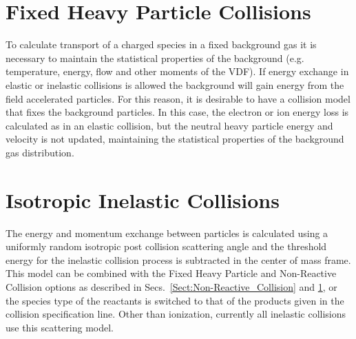 \documentclass[letterpaper,10pt,english,openany,oneside]{sphinxmanual}
\begin{document}
\section{Fixed Heavy Particle Collisions} 
\label{Sect:Fixed_Heavy_Particle_Collision}
To calculate transport of a charged species in a fixed background gas it is necessary to
maintain the statistical properties of the background (e.g. temperature, energy, flow and
other moments of the VDF). If energy exchange in elastic or inelastic collisions is
allowed the background will gain energy from the field accelerated particles. For this
reason, it is desirable to have a collision model that fixes the background particles. In
this case, the electron or ion energy loss is calculated as in an elastic collision, but
the neutral heavy particle energy and velocity is not updated, maintaining the
statistical properties of the background gas distribution.

\section{Isotropic Inelastic Collisions}
The energy and momentum exchange between particles is calculated using a uniformly random
isotropic post collision scattering angle and the threshold energy for the inelastic
collision process is subtracted in the center of mass frame. This model can be combined
with the Fixed Heavy Particle and Non-Reactive Collision options as described in
Secs.~\ref{Sect:Non-Reactive_Collision} and \ref{Sect:Fixed_Heavy_Particle_Collision},
or the species type of the reactants is switched to that of the products given in the
collision specification line. Other than ionization, currently all inelastic collisions
use this scattering model.
\end{document}
